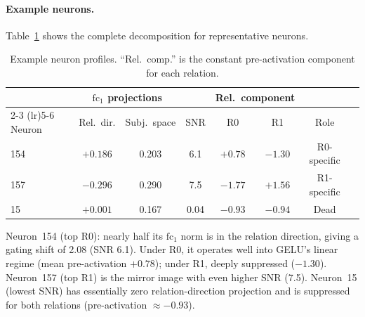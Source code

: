 \documentclass[11pt,a4paper]{article}
\newcommand{\fc}{\mathrm{fc}}
\begin{document}
\paragraph{Example neurons.}
Table~\ref{tab:example_neurons} shows the complete decomposition for
representative neurons.

\begin{table}[h]
\centering
\caption{Example neuron profiles. ``Rel.\ comp.'' is the constant
  pre-activation component for each relation.}
\label{tab:example_neurons}
\begin{tabular}{lccccccc}
\toprule
 & \multicolumn{2}{c}{$\fc_1$ projections} & & \multicolumn{2}{c}{Rel.\ component} & \\
\cmidrule(lr){2-3} \cmidrule(lr){5-6}
Neuron & Rel.\ dir. & Subj.\ space & SNR & R0 & R1 & Role \\
\midrule
154 & $+0.186$ & 0.203 & 6.1 & $+0.78$ & $-1.30$ & R0-specific \\
157 & $-0.296$ & 0.290 & 7.5 & $-1.77$ & $+1.56$ & R1-specific \\
15  & $+0.001$ & 0.167 & 0.04 & $-0.93$ & $-0.94$ & Dead \\
\bottomrule
\end{tabular}
\end{table}

\noindent Neuron~154 (top R0): nearly half its $\fc_1$ norm is in the
relation direction, giving a gating shift of 2.08 (SNR 6.1). Under R0,
it operates well into GELU's linear regime (mean pre-activation
$+0.78$); under R1, deeply suppressed ($-1.30$). Neuron~157 (top R1)
is the mirror image with even higher SNR (7.5). Neuron~15 (lowest SNR)
has essentially zero relation-direction projection and is suppressed
for both relations (pre-activation $\approx -0.93$).


\end{document}
